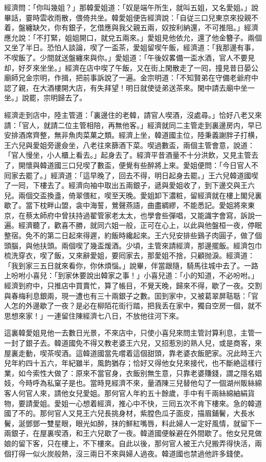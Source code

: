 經濟問：「你叫幾姐？」那韓愛姐道：「奴是端午所生，就叫五姐，又名愛姐。」說畢話，霎時雲收雨散，偎倚共坐。韓愛姐便告經濟說：「自従三口兒東京來投親不着，盤纏缺欠，你有銀子，乞借應與我父親五兩，奴按利納還，不可推阻。」經濟應允說：「不打緊，姐姐開口，就兌五兩來。」愛姐見他依允，還了他金簪子。兩個又坐了半日。恐怕人談論，喫了一盃茶，愛姐留喫午飯，經濟道：「我那邊有事，不喫飯了。少間就送盤纏來與你。」愛姐道：「午後奴畧備一盃水酒，官人不要見却，好歹來坐坐。」經濟在店中喫了午飯，又在街上閑散走了一囘，撞見昔日晏公廟師兄金宗明，作揖，把前事訴說了一遍。金宗明道：「不知賢弟在守備老爺府中認了親，在大酒樓開大店，有失拜望！明日就使徒弟送茶來。閑中請去廟中坐一坐。」說罷，宗明歸去了。

經濟走到店中，陸主管道：「裏邊住的老韓，請官人喫酒，沒處尋。」恰好八老又來請：「官人，就請二位主管相陪，再無他客。」經濟就同二主管走到裏邊房内，早已安排酒席齊整，無非魚肉菜菓之類。經濟上坐，韓道國主位，陸秉義謝胖子打横，王六兒與愛姐旁邊僉坐，八老往來篩酒下菜。喫過數盃，兩個主管會意，說道：「官人慢坐，小人櫃上看去。」起身去了。經濟平昔酒量不十分洪飲，又見主管去了，開懷與韓道國三口兒喫了數盃，便覺有些醉將上來。愛姐便問：「今日官人不囘家去罷了。」經濟道：「這早晚了，回去不得，明日起身去罷。」王六兒韓道國喫了一囘，下樓去了。經濟向袖中取出五兩銀子，遞與愛姐收了，到下邊交與王六兒。兩個交盃換盞，倚翠偎紅，喫至天晚。愛姐卸下濃粧，留經濟就在樓上閣兒裏歇了。當下枕畔山盟，衾中海誓，鶯聲燕語，曲盡綢繆，不能悉記。愛姐將來東京，在蔡太師府中曾扶持過翟管家老太太，也學會些彈唱，又能識字會寫，訴說一遍。經濟聽了，歡喜不勝，就同六姐一般，正可在心上，以此與他盤桓一夜，停眠整宿。免不的第二日起來得遲，約飯時纔起來。王六兒安排些鷄子肉圓子，做了個頭腦，與他扶頭。兩個喫了幾盃煖酒。少頃，主管來請經濟，那邊擺飯。經濟包巾梳洗穿衣，喫了飯，又來辭愛姐，要囘家去，那愛姐不捨，只顧抛淚。經濟道：「我到家三五日就來看你，你休煩惱。」說畢，伴當跟隨，騎馬往城中去了。一路上吩咐小喜兒：「到家休要說出韓家之事！」小喜兒道：「小的知道，不必吩咐。」經濟到府中，只推店中買賣忙，算了帳目，不覺天晚，歸來不得，歇了一夜。交割與春梅利息銀兩，現一遭也有三十兩銀子之數。囬到家中，又被葛翠屏聐聒：「官人怎的外邊歇了一夜？是必在柳陌花街行踏，把我丢在家中，獨自空房一個，就不思想來家！」一連留住陳經濟七八日，不放他往河下來。

這裏韓愛姐見他一去數日光景，不來店中，只使小喜兒來問主管討算利息，主管一一封了銀子去。韓道國免不得又教老婆王六兒，又招惹別的熟人兒，或是商客，來屋裏走動，喫茶喫酒。這韓道國當先嚐着這個甜頭，靠老婆衣飯肥家。况此時王六兒年約四十五六，年紀雖半，風韵猶存；恰好又得他女兒來接代，也不斷絶這樣行業，如今索性大做了：原來不當官身，衣飯别無生意，只靠老婆賺錢，謂之隱名娼妓，今時呼為私窠子是也。當時見經濟不來，量酒陳三兒替他勾了一個湖州販絲綿客人何官人來，請他女兒愛姐。那何官人年約五十餘歲，手中有千兩絲綿紬絹貨物，要請愛姐。愛姐一心想着經濟，推心中不快，三囘五次不肯下樓來。急的韓道國了不的。那何官人又見王六兒長挑身材，紫膛色瓜子面皮，描眉鋪鬢，大長水鬢，涎鄧鄧一雙星眼，眼光如醉，抹的鮮紅嘴唇，料此婦人一定好風情，就留下一兩銀子，在屋裏喫酒，和王六兒歇了一夜。韓道國便躲避在外間歇了。他女兒見做娘的留下客，只在樓上，不下樓來。自此以後，那何官人被王六兒搬弄得快活，兩個打得一似火炭般熱，沒三兩日不來與婦人過夜。韓道國也禁過他許多錢使。

